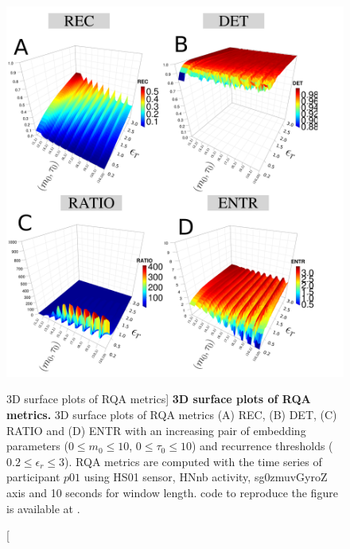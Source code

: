 \begin{figure}[h!]
\centering
\includegraphics[width=1.0\textwidth]{fig_5_15}
    \caption
	[3D surface plots of RQA metrics]{
	{\bf 3D surface plots of RQA metrics.}
	3D surface plots of RQA metrics (A) REC, (B) DET, (C) RATIO and 
	(D) ENTR with an increasing pair of embedding parameters 
	($0 \le m_0 \le 10$, $0 \le \tau_0 \le 10$) 
	and recurrence thresholds ($ 0.2 \le \epsilon_r \le 3 $).
	RQA metrics are computed with the time series of participant $p01$ using 
	HS01 sensor, HNnb activity, sg0zmuvGyroZ axis and 10 seconds 
	for window length.
	\R code to reproduce the figure is available at 
	.
	}
\label{fig:topo_rqas_w500}
\end{figure}

\newpage
